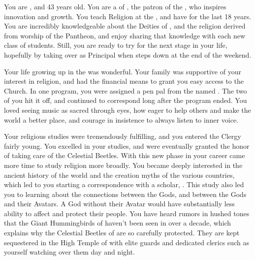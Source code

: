 \documentclass[char]{GL2020}
\begin{document}
\name{\cBeetle{}}

You are \cBeetle{\intro}, and 43 years old. You are a \cBeetle{\cleric} of \cTechGod{}, the patron \cTechGod{\God} of the \pTech{}, who inspires innovation and growth. You teach Religion at the \pSchool{}, and have for the last 18 years. You are incredibly knowledgeable about the Deities of \pEarth{}, and the religion derived from worship of the Pantheon, and enjoy sharing that knowledge with each new class of students. Still, you are ready to try for the next stage in your life, hopefully by taking over as Principal when \cPrincipal{\full} steps down at the end of the weekend.

Your life growing up in the \pTech{} was wonderful. Your family was supportive of your interest in religion, and had the financial means to grant you easy access to the Church. In one program, you were assigned a pen pal from the \pFarm{} named \cMusic{\full}. The two of you hit it off, and continued to correspond long after the program ended. You loved seeing music as sacred through \cMusic{\their} eyes, how eager \cMusic{\theywere} to help others and make the world a better place, and \cMusic{\their} courage in \cMusic{\their} insistence to always listen to \cMusic{\their} inner voice.

Your religious studies were tremendously fulfilling, and you entered the Clergy fairly young. You excelled in your studies, and were eventually granted the honor of taking care of the Celestial Beetles. With this new phase in your career came more time to study religion more broadly. You became deeply interested in the ancient history of the world and the creation myths of the various countries, which led to you starting a correspondence with a \pShippie{} scholar, \cEbbPriest{\full}. This study also led you to learning about the connections between the Gods, and between the Gods and their Avatars. A God without their Avatar would have substantially less ability to affect \pEarth{} and protect their people. You have heard rumors in hushed tones that the Giant Hummingbirds of \cFarmGod{} haven't been seen in over a decade, which explains why the Celestial Beetles of \cTechGod{} are so carefully protected. They are kept sequestered in the High Temple of \cTechGod{} with elite guards and dedicated clerics such as yourself watching over them day and night.
\end{document}
